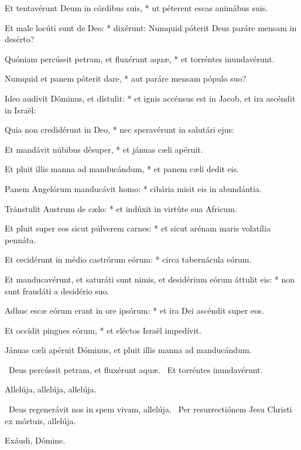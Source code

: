 Et tentavérunt Deum in córdibus suis, * ut péterent escas animábus suis.

Et male locúti sunt de Deo: * dixérunt: Numquid póterit Deus paráre mensam in desérto?

Quóniam percússit petram, et fluxérunt aquæ, * et torréntes inundavérunt.

Numquid et panem póterit dare, * aut paráre mensam pópulo suo?

Ideo audívit Dóminus, et dístulit: * et ignis accénsus est in Jacob, et ira ascéndit in Israël:

Quia non credidérunt in Deo, * nec speravérunt in salutári ejus:

Et mandávit núbibus désuper, * et jánuas cæli apéruit.

Et pluit illis manna ad manducándum, * et panem cæli dedit eis.

Panem Angelórum manducávit homo: * cibária misit eis in abundántia.

Tránstulit Austrum de cælo: * et indúxit in virtúte sua Africum.

Et pluit super eos sicut púlverem carnes: * et sicut arénam maris volatília pennáta.

Et cecidérunt in médio castrórum eórum: * circa tabernácula eórum.

Et manducavérunt, et saturáti sunt nimis, et desidérium eórum áttulit eis: * non sunt fraudáti a desidério suo.

Adhuc escæ eórum erant in ore ipsórum: * et ira Dei ascéndit super eos.

Et occídit pingues eórum, * et eléctos Israël impedívit.

 Jánuas cæli apéruit Dóminus, et pluit illis manna ad manducándum.

\sectionornament



\V\ Deus percússit petram, et fluxérunt aquæ. \R\ Et torréntes inundavérunt.



 Allelúja, allelúja, allelúja.

\V\ Deus regenerávit nos in spem vivam, allelúja. \R\ Per resurrectiónem Jesu Christi ex mórtuis, allelúja.

 Exáudi, Dómine.

